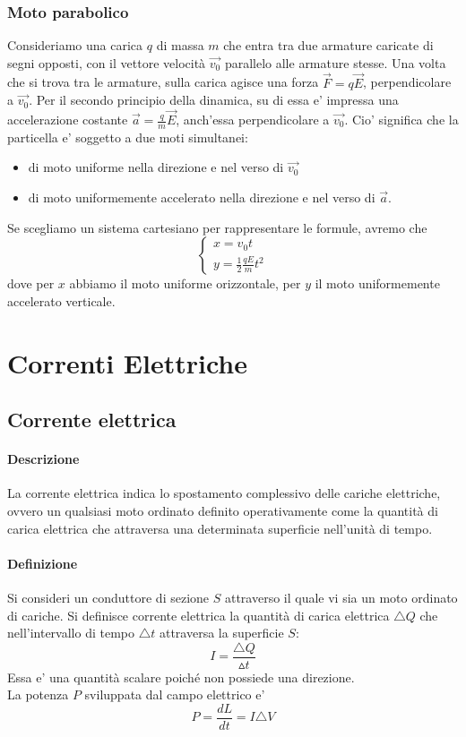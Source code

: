\documentclass[a4paper, 10pt]{article}
\begin{document}
			\subsubsection{Moto parabolico}
			Consideriamo una carica $q$ di massa $m$  che entra tra due armature caricate di segni opposti, con 
			il vettore velocità $\overrightarrow{v_0}$ parallelo alle armature stesse.
			Una volta che si trova tra le armature, sulla carica agisce una forza $\overrightarrow{F} = q\overrightarrow{E}$,
			perpendicolare a $\overrightarrow{v_0}$. Per il secondo principio della dinamica, su di essa e' impressa una
			accelerazione costante $\overrightarrow{a} = \frac{q}{m}\overrightarrow{E}$, anch'essa perpendicolare a 
			$\overrightarrow{v_0}$. Cio' significa che la particella e' soggetto a due moti simultanei:
			\begin{itemize}
				\item di moto uniforme nella direzione e nel verso di $\overrightarrow{v_0}$
				\item di moto uniformemente accelerato nella direzione e nel verso di $\overrightarrow{a}$.
			\end{itemize}
			Se scegliamo un sistema cartesiano per rappresentare le formule, avremo che 
			\[ \begin{cases} x = v_0 t \\ y = \frac{1}{2} \frac{qE}{m}t^2 \end{cases}\]
			dove per $x$ abbiamo il moto uniforme orizzontale, 
			per $y$ il moto uniformemente accelerato verticale.
			
	\newpage
	\section{Correnti Elettriche}
		\subsection{Corrente elettrica}
			\paragraph*{Descrizione}			
			La corrente elettrica indica lo spostamento complessivo delle cariche elettriche, ovvero un qualsiasi moto ordinato
			definito operativamente come la quantità di carica elettrica che attraversa una determinata superficie nell'unità 
			di tempo.
			\paragraph*{Definizione}
			Si consideri un conduttore di sezione $S$ attraverso il quale vi sia un moto ordinato di cariche. Si definisce
			corrente elettrica la quantità di carica elettrica $\triangle Q$ che nell'intervallo di tempo $\triangle t$ attraversa 
			la superficie $S$: 
			\[ I = \frac{\triangle Q}{\vartriangle t} \]
			Essa e' una quantità scalare poiché non possiede una direzione. \\ La potenza $P$ sviluppata dal campo elettrico e'
			\[ P = \frac{dL}{dt} = I \triangle V \]
\end{document}
